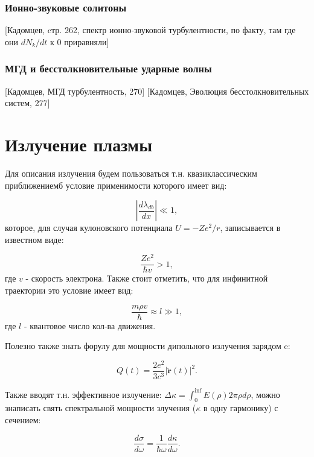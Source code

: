 \documentclass[10pt, a4paper]{article}
\let\stdsection\section
\renewcommand\section{\newpage\stdsection}
\begin{document}
\subsubsection{Ионно-звуковые солитоны}
[Кадомцев, cтр. 262, спектр ионно-звуковой турбулентности, по факту, там где они $dN_k/dt$ к 0 приравняли]


\subsubsection{МГД и бесстолкновительные ударные волны}
[Кадомцев, МГД турбулентность, 270]
[Кадомцев, Эволюция бесстолкновительных систем,  277]


\section{Излучение плазмы}

Для описания излучения будем пользоваться т.н. квазиклассическим приближениемб условие применимости которого имеет вид:

\begin{equation}
    |\frac{d \lambda_{db}}{dx}|\ll 1,
\end{equation}
которое, для случая кулоновского потенциала $U=-Ze^2/r$, записывается в известном виде:

\begin{equation}
    \frac{Ze^2}{\hbar v} > 1,
\end{equation}
где $v$ - скорость электрона. Также стоит отметить, что для инфинитной траектории это условие имеет вид:

\begin{equation}
    \frac{m \rho v}{\hbar} \approx l \gg 1,
\end{equation}
где $l$ - квантовое число кол-ва движения.

Полезно также знать форулу для мощности дипольного излучения зарядом e:

\begin{equation}
    Q(t) = \frac{2e^2}{3c^3}|\ddot{\mathbf{r}}(t)|^2.
\end{equation}

Также вводят т.н. эффективное излучение: $\Delta \kappa = \int_0^{\inf} E(\rho) 2\pi \rho d\rho$, можно знаписать свять
спектральной мощности злучения ($\kappa$ в одну гармонику) с сечением:

\begin{equation}
    \frac{d\sigma}{d\omega}=\frac{1}{\hbar\omega} \frac{d\kappa}{d\omega}.
\end{equation}
\end{document}
